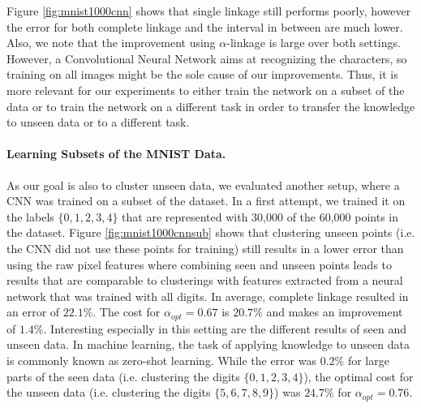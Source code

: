 Figure \ref{fig:mnist1000cnn} shows that single linkage still performs poorly, however the error for both complete linkage and the interval in between are much lower. Also, we note that the improvement using $\alpha$-linkage is large over both settings. However, a Convolutional Neural Network aims at recognizing the characters, so training on all images might be the sole cause of our improvements. Thus, it is more relevant for our experiments to either train the network on a subset of the data or to train the network on a different task in order to transfer the knowledge to unseen data or to a different task.

\paragraph{Learning Subsets of the MNIST Data.} As our goal is also to cluster unseen data, we evaluated another setup, where a CNN was trained on a subset of the dataset. In a first attempt, we trained it on the labels $\{0,1,2,3,4\}$ that are represented with 30,000 of the 60,000 points in the dataset. Figure \ref{fig:mnist1000cnnsub} shows that clustering unseen points (i.e. the CNN did not use these points for training) still results in a lower error than using the raw pixel features where combining seen and unseen points leads to results that are comparable to clusterings with features extracted from a neural network that was trained with all digits. In average, complete linkage resulted in an error of $22.1\%$. The cost for $\alpha_{opt} = 0.67$ is $20.7\%$ and makes an improvement of $1.4\%$. Interesting especially in this setting are the different results of seen and unseen data. In machine learning, the task of applying knowledge to unseen data is commonly known as zero-shot learning. While the error was $0.2\%$ for large parts of the seen data (i.e. clustering the digits $\{0,1,2,3,4\}$), the optimal cost for the unseen data (i.e. clustering the digits $\{5,6,7,8,9\}$) was $24.7\%$ for $\alpha_{opt} = 0.76$. 

